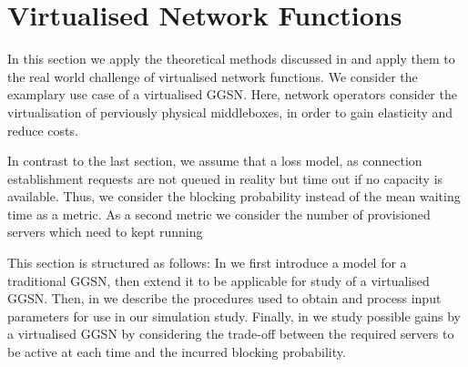 \section{Virtualised Network Functions}\label{sec:cloud:virtualized_network_functions}

\newcommand{\blockingprobability}[0]{p_B}
\newcommand{\maxServers}[0]{S_{\max}}

\cite{Metzger2014a}
In this section we apply the theoretical methods discussed in  and apply them to the real world challenge of virtualised network functions.
We consider the examplary use case of a virtualised \gls{GGSN}.
Here, network operators consider the virtualisation of perviously physical middleboxes, in order to gain elasticity and reduce costs.

In contrast to the last section, we assume that a loss model, as connection establishment requests are not queued in reality but time out if no capacity is available.
Thus, we consider the blocking probability instead of the mean waiting time as a metric.
As a second metric we consider the number of provisioned servers which need to kept running 

This section is structured as follows:
In  we first introduce a model for a traditional \gls{GGSN}, then extend it to be applicable for study of a virtualised \gls{GGSN}.
Then, in  we describe the procedures used to obtain and process input parameters for use in our simulation study.
Finally, in  we study possible gains by a virtualised \gls{GGSN} by considering the trade-off between the required servers to be active at each time and the incurred blocking probability. 



